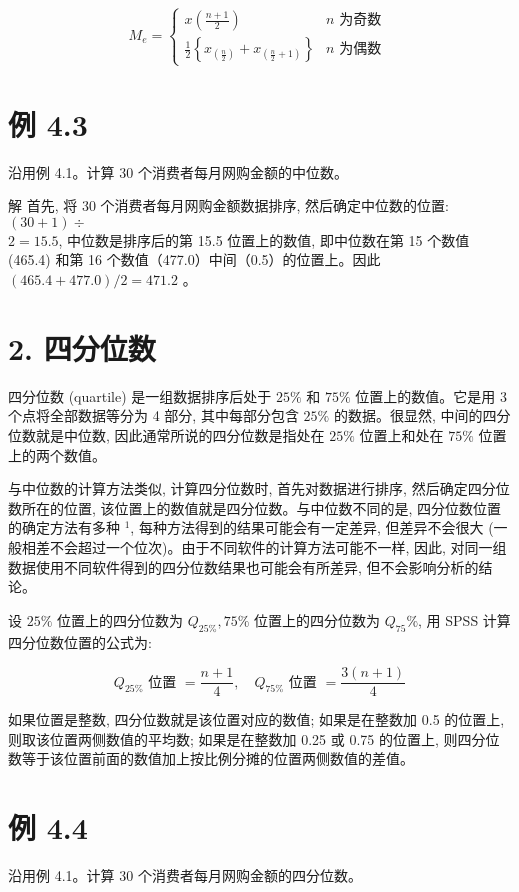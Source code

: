 \documentclass[10pt]{article}
\begin{document}
\begin{CJK*}{UTF8}{bsmi}
\[
M_{e}= \begin{cases}x\left(\frac{n+1}{2}\right) & n \text { 为奇数 }  \tag{4.3}\\ \frac{1}{2}\left\{x_{\left(\frac{n}{2}\right)}+x_{\left(\frac{n}{2}+1\right)}\right\} & n \text { 为偶数 }\end{cases}
\]

\section*{例 4.3}
沿用例 4.1。计算 30 个消费者每月网购金额的中位数。

解 首先, 将 30 个消费者每月网购金额数据排序, 然后确定中位数的位置: $(30+1) \div$\\
$2=15.5$, 中位数是排序后的第 15.5 位置上的数值, 即中位数在第 15 个数值 (465.4) 和第 16 个数值（477.0）中间（0.5）的位置上。因此 $(465.4+477.0) / 2=471.2$ 。

\section*{2. 四分位数}
四分位数 (quartile) 是一组数据排序后处于 $25 \%$ 和 $75 \%$ 位置上的数值。它是用 3 个点将全部数据等分为 4 部分, 其中每部分包含 $25 \%$ 的数据。很显然, 中间的四分位数就是中位数, 因此通常所说的四分位数是指处在 $25 \%$ 位置上和处在 $75 \%$ 位置上的两个数值。

与中位数的计算方法类似, 计算四分位数时, 首先对数据进行排序, 然后确定四分位数所在的位置, 该位置上的数值就是四分位数。与中位数不同的是, 四分位数位置的确定方法有多种 ${ }^{1}$, 每种方法得到的结果可能会有一定差异, 但差异不会很大 (一般相差不会超过一个位次)。由于不同软件的计算方法可能不一样, 因此, 对同一组数据使用不同软件得到的四分位数结果也可能会有所差异, 但不会影响分析的结论。

设 $25 \%$ 位置上的四分位数为 $Q_{25 \%}, 75 \%$ 位置上的四分位数为 $Q_{75} \%$, 用 SPSS 计算四分位数位置的公式为:


\begin{equation*}
Q_{25 \%} \text { 位置 }=\frac{n+1}{4}, \quad Q_{75 \%} \text { 位置 }=\frac{3(n+1)}{4} \tag{4.4}
\end{equation*}


如果位置是整数, 四分位数就是该位置对应的数值; 如果是在整数加 0.5 的位置上,则取该位置两侧数值的平均数; 如果是在整数加 0.25 或 0.75 的位置上, 则四分位数等于该位置前面的数值加上按比例分摊的位置两侧数值的差值。

\section*{例 4.4}
沿用例 4.1。计算 30 个消费者每月网购金额的四分位数。


\end{CJK*}
\end{document}
